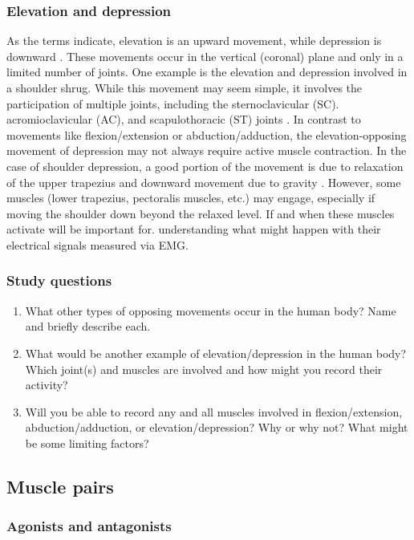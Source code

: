 \documentclass{article}
\begin{document}
\subsubsection{Elevation and depression}

As the terms indicate, elevation is an upward movement, while depression is downward \citep{openStax_movements}. These movements occur in the vertical (coronal) plane and only in a limited number of joints. One example is the elevation and depression involved in a shoulder shrug. While this movement may seem simple, it involves the participation of multiple joints, including the sternoclavicular (SC). acromioclavicular (AC), and scapulothoracic (ST) joints \citep{dvir1978shoulder}. In contrast to movements like flexion/extension or abduction/adduction, the elevation-opposing movement of depression may not always require active muscle contraction. In the case of shoulder depression, a good portion of the movement is due to relaxation of the upper trapezius and downward movement due to gravity \citep{cowan2023back}. However, some muscles (lower trapezius, pectoralis muscles, etc.) may engage, especially if moving the shoulder down beyond the relaxed level. If and when these muscles activate will be important for. understanding what might happen with their electrical signals measured via EMG.

\subsubsection{Study questions}

\begin{enumerate}
\item What other types of opposing movements occur in the human body? Name and briefly describe each.
\item What would be another example of elevation/depression in the human body? Which joint(s) and muscles are involved and how might you record their activity?
\item Will you be able to record any and all muscles involved in flexion/extension, abduction/adduction, or elevation/depression? Why or why not? What might be some limiting factors?
\end{enumerate}

\subsection{Muscle pairs}

\subsubsection{Agonists and antagonists}
\end{document}
